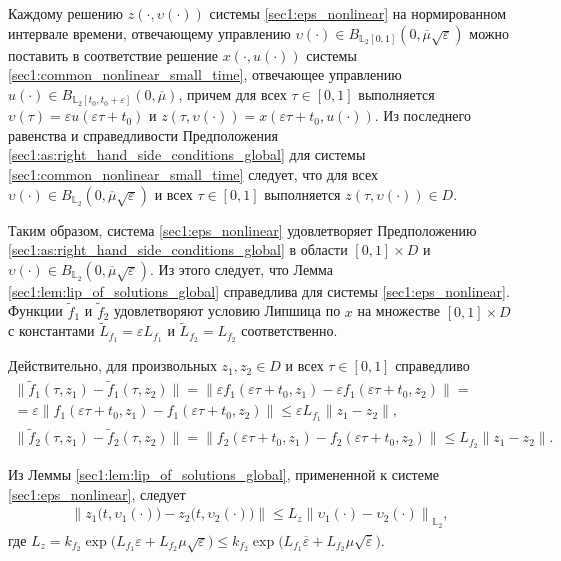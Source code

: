\documentclass[../main.tex]{subfiles}
\begin{document}
Каждому решению $z(\cdot, \upsilon(\cdot))$ системы \eqref{sec1:eps_nonlinear} на нормированном интервале времени, отвечающему управлению $\upsilon(\cdot) \in B_{\mathbb{L}_2[0, 1]} (0, \overline{\mu} \sqrt{\varepsilon})$ можно поставить в соответствие решение $x(\cdot, u(\cdot))$ системы \eqref{sec1:common_nonlinear_small_time}, отвечающее управлению $u(\cdot) \in B_{\mathbb{L}_2[t_0, t_0 + \varepsilon]} (0, \overline{\mu})$, причем для всех $\tau \in [0, 1] $ выполняется $ \upsilon(\tau) = \varepsilon u(\varepsilon \tau + t_0)$ и $ z(\tau, \upsilon(\cdot)) = x(\varepsilon \tau + t_0, u(\cdot)) $.
Из последнего равенства и справедливости Предположения \ref{sec1:as:right_hand_side_conditions_global} для системы \eqref{sec1:common_nonlinear_small_time} следует, что для всех  $\upsilon(\cdot) \in B_{\mathbb{L}_2}(0, \overline{\mu}\sqrt{\varepsilon})$ и всех $\tau \in [0, 1] $ выполняется $z(\tau, \upsilon(\cdot)) \in D$. 

Таким образом, система \eqref{sec1:eps_nonlinear}  удовлетворяет Предположению  \ref{sec1:as:right_hand_side_conditions_global} в области $[0, 1]\times D$ и $\upsilon(\cdot) \in B_{\mathbb{L}_2}(0, \overline{\mu}\sqrt{\varepsilon}) $.
Из этого следует, что Лемма \ref{sec1:lem:lip_of_solutions_global} справедлива для системы  \eqref{sec1:eps_nonlinear}.
Функции  $\widetilde{f}_1$ и $\widetilde{f}_2$ удовлетворяют условию Липшица по $x$ на множестве $[0, 1]\times D$ с константами $\widetilde{L}_{f_1} = \varepsilon L_{f_1} $ и  $\widetilde{L}_{f_2} = L_{f_2} $ соответственно. 

Действительно, для произвольных $z_1, z_2 \in D$ и всех  $\tau \in [0, 1]$ справедливо
\begin{gather*}
	\|  \widetilde{f}_1(\tau, z_1) -  \widetilde{f}_1(\tau, z_2) \| = \|  \varepsilon f_1(\varepsilon \tau + t_0, z_1) -   \varepsilon f_1(\varepsilon \tau + t_0, z_2) \| = \\ =
	\varepsilon \|  f_1(\varepsilon \tau + t_0, z_1) -  f_1(\varepsilon \tau + t_0, z_2) \| \leqslant \varepsilon L_{f_1} \|z_1 - z_2 \|, \\
	\| \widetilde{f}_2 (\tau,z_1) - \widetilde{f}_2 (\tau,z_2) \| =  \| f_2(\varepsilon \tau + t_0,z_1) - f_2(\varepsilon \tau + t_0,z_2) \| \leqslant  L_{f_2} \|z_1 - z_2 \|.
\end{gather*}
    
Из  Леммы \ref{sec1:lem:lip_of_solutions_global}, примененной  к системе \eqref{sec1:eps_nonlinear}, следует
\begin{gather*}
    \left\| z_1\big(t, \upsilon_1(\cdot) \big) - z_2\big(t, \upsilon_2(\cdot)\big) \right\| \leqslant L_z \left\|\upsilon_1(\cdot) - \upsilon_2(\cdot) \right\|_{\mathbb{L}_2},
\end{gather*}
где $ L_z = k_{f_2} \exp\Big( L_{f_1} \varepsilon + L_{f_2} \mu \sqrt{\varepsilon} \Big) \leqslant k_{f_2} \exp\Big( L_{f_1} \overline{\varepsilon} + L_{f_2} \mu \sqrt{\overline{\varepsilon}} \Big)$.
    
\end{document}
